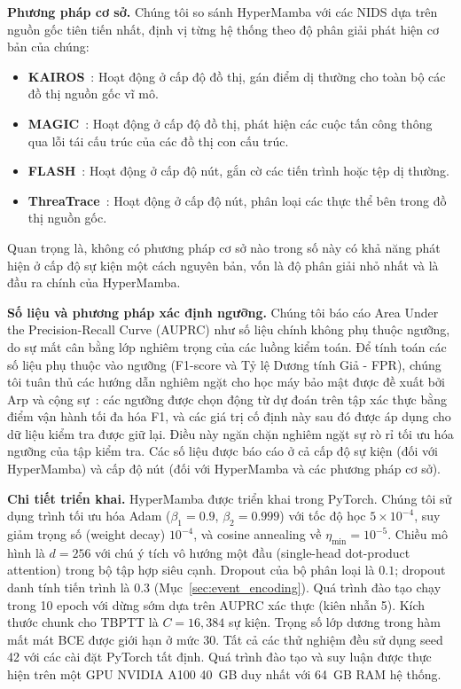 \documentclass[letterpaper,twocolumn,10pt]{article}
\begin{document}
\textbf{Phương pháp cơ sở.} Chúng tôi so sánh HyperMamba với các NIDS dựa trên nguồn gốc tiên tiến nhất, định vị từng hệ thống theo độ phân giải phát hiện cơ bản của chúng:
\begin{itemize}
    \item \textbf{KAIROS}~\cite{cheng2024kairos}: Hoạt động ở cấp độ đồ thị, gán điểm dị thường cho toàn bộ các đồ thị nguồn gốc vĩ mô.
    \item \textbf{MAGIC}~\cite{jia2024magic}: Hoạt động ở cấp độ đồ thị, phát hiện các cuộc tấn công thông qua lỗi tái cấu trúc của các đồ thị con cấu trúc.
    \item \textbf{FLASH}~\cite{rehman2024flash}: Hoạt động ở cấp độ nút, gắn cờ các tiến trình hoặc tệp dị thường.
    \item \textbf{ThreaTrace}~\cite{Wang2021THREATRACEDA}: Hoạt động ở cấp độ nút, phân loại các thực thể bên trong đồ thị nguồn gốc.
\end{itemize}
Quan trọng là, không có phương pháp cơ sở nào trong số này có khả năng phát hiện ở cấp độ sự kiện một cách nguyên bản, vốn là độ phân giải nhỏ nhất và là đầu ra chính của HyperMamba.

\textbf{Số liệu và phương pháp xác định ngưỡng.} Chúng tôi báo cáo Area Under the Precision-Recall Curve (AUPRC) như số liệu chính không phụ thuộc ngưỡng, do sự mất cân bằng lớp nghiêm trọng của các luồng kiểm toán. Để tính toán các số liệu phụ thuộc vào ngưỡng (F1-score và Tỷ lệ Dương tính Giả - FPR), chúng tôi tuân thủ các hướng dẫn nghiêm ngặt cho học máy bảo mật được đề xuất bởi Arp và cộng sự~\cite{arp2022dos}: các ngưỡng được chọn động từ dự đoán trên tập xác thực bằng điểm vận hành tối đa hóa F1, và các giá trị cố định này sau đó được áp dụng cho dữ liệu kiểm tra được giữ lại. Điều này ngăn chặn nghiêm ngặt sự rò rỉ tối ưu hóa ngưỡng của tập kiểm tra. Các số liệu được báo cáo ở cả cấp độ sự kiện (đối với HyperMamba) và cấp độ nút (đối với HyperMamba và các phương pháp cơ sở).

\textbf{Chi tiết triển khai.} HyperMamba được triển khai trong PyTorch. Chúng tôi sử dụng trình tối ưu hóa Adam ($\beta_1\!=\!0.9$, $\beta_2\!=\!0.999$) với tốc độ học $5 \times 10^{-4}$, suy giảm trọng số (weight decay) $10^{-4}$, và cosine annealing về $\eta_{\min}=10^{-5}$. Chiều mô hình là $d=256$ với chú ý tích vô hướng một đầu (single-head dot-product attention) trong bộ tập hợp siêu cạnh. Dropout của bộ phân loại là $0.1$; dropout danh tính tiến trình là $0.3$ (Mục~\ref{sec:event_encoding}). Quá trình đào tạo chạy trong 10 epoch với dừng sớm dựa trên AUPRC xác thực (kiên nhẫn 5). Kích thước chunk cho TBPTT là $C=16{,}384$ sự kiện. Trọng số lớp dương trong hàm mất mát BCE được giới hạn ở mức 30. Tất cả các thử nghiệm đều sử dụng seed 42 với các cài đặt PyTorch tất định. Quá trình đào tạo và suy luận được thực hiện trên một GPU NVIDIA A100 40~GB duy nhất với 64~GB RAM hệ thống.
\end{document}
